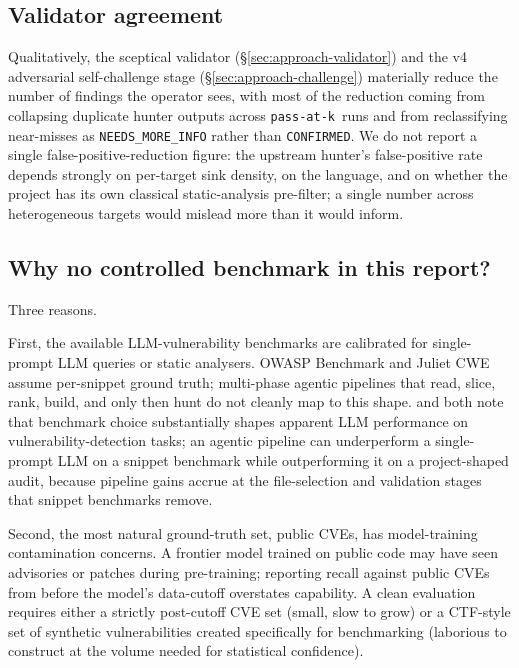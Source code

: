 \documentclass[11pt,a4paper]{article}
\begin{document}
\subsection{Validator agreement}
\label{sec:eval-validator}

Qualitatively, the sceptical validator (\S\ref{sec:approach-validator}) and
the v4 adversarial self-challenge stage (\S\ref{sec:approach-challenge})
materially reduce the number of findings the operator sees, with most of
the reduction coming from collapsing duplicate hunter outputs across
\texttt{pass-at-k}~runs and from reclassifying near-misses as
\texttt{NEEDS\_MORE\_INFO} rather than \texttt{CONFIRMED}. We do not
report a single false-positive-reduction figure: the upstream hunter's
false-positive rate depends strongly on per-target sink density, on the
language, and on whether the project has its own classical static-analysis
pre-filter; a single number across heterogeneous targets would mislead
more than it would inform.

\subsection{Why no controlled benchmark in this report?}
\label{sec:eval-why-no-bench}

Three reasons.

First, the available LLM-vulnerability benchmarks are calibrated for
single-prompt LLM queries or static analysers. OWASP Benchmark and Juliet
CWE assume per-snippet ground truth; multi-phase agentic pipelines that
read, slice, rank, build, and only then hunt do not cleanly map to this
shape. \citet{semgrepNeedles2026} and \citet{ndss2025} both note that
benchmark choice substantially shapes apparent LLM performance on
vulnerability-detection tasks; an agentic pipeline can underperform a
single-prompt LLM on a snippet benchmark while outperforming it on a
project-shaped audit, because pipeline gains accrue at the
file-selection and validation stages that snippet benchmarks remove.

Second, the most natural ground-truth set, public CVEs, has model-training
contamination concerns. A frontier model trained on public code may have
seen advisories or patches during pre-training; reporting recall against
public CVEs from before the model's data-cutoff overstates capability.
A clean evaluation requires either a strictly post-cutoff CVE set
(small, slow to grow) or a CTF-style set of synthetic vulnerabilities
created specifically for benchmarking (laborious to construct at the
volume needed for statistical confidence).
\end{document}
